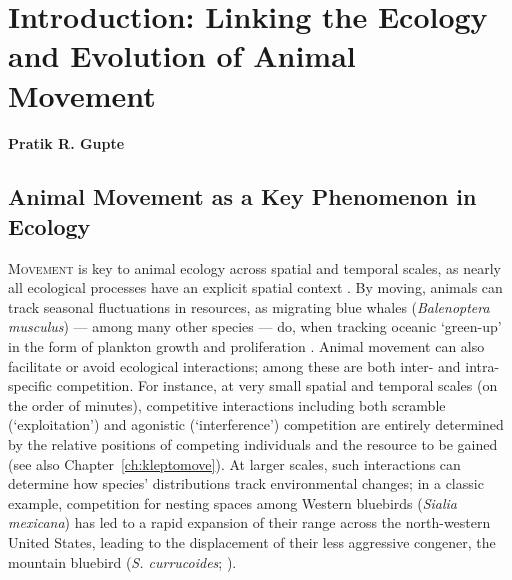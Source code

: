 
{}%
\chapter{Introduction: Linking the Ecology and Evolution of Animal Movement}\label{ch:introduction}

\textbf{Pratik R. Gupte}

\medskip


\section*{Animal Movement as a Key Phenomenon in Ecology}

\lettrine{M}{ovement} is key to animal ecology across spatial and temporal scales, as nearly all ecological processes have an explicit spatial context \citep{nathan2008a}.
By moving, animals can track seasonal fluctuations in resources, as migrating blue whales (\emph{Balenoptera musculus}) --- among many other species --- do, when tracking oceanic `green-up' in the form of plankton growth and proliferation \parencite{abrahms2021a,abrahms2019}.
Animal movement can also facilitate or avoid ecological interactions; among these are both inter- and intra-specific competition.
For instance, at very small spatial and temporal scales (on the order of minutes), competitive interactions including both scramble (`exploitation') and agonistic (`interference') competition \parencite[][]{keddy2001,birch1957} are entirely determined by the relative positions of competing individuals and the resource to be gained (see also Chapter~\ref{ch:kleptomove}).
At larger scales, such interactions can determine how species' distributions track environmental changes; in a classic example, competition for nesting spaces among Western bluebirds (\emph{Sialia mexicana}) has led to a rapid expansion of their range across the north-western United States, leading to the displacement of their less aggressive congener, the mountain bluebird (\emph{S. currucoides}; \cite{duckworth2007}).

